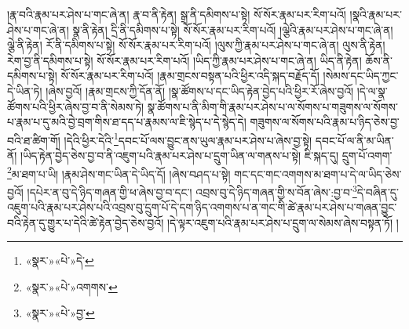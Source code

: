 །རྣ་བའི་རྣམ་པར་ཤེས་པ་གང་ཞེ་ན། རྣ་བ་ནི་རྟེན། སྒྲ་ནི་དམིགས་པ་སྟེ། སོ་སོར་རྣམ་པར་རིག་པའོ། །སྣའི་རྣམ་པར་ཤེས་པ་གང་ཞེ་ན། སྣ་ནི་རྟེན། དྲི་ནི་དམིགས་པ་སྟེ། སོ་སོར་རྣམ་པར་རིག་པའོ། །ལྕེའི་རྣམ་པར་ཤེས་པ་གང་ཞེ་ན། ལྕེ་ནི་རྟེན། རོ་ནི་དམིགས་པ་སྟེ། སོ་སོར་རྣམ་པར་རིག་པའོ། །ལུས་ཀྱི་རྣམ་པར་ཤེས་པ་གང་ཞེ་ན། ལུས་ནི་རྟེན། རེག་བྱ་ནི་དམིགས་པ་སྟེ། སོ་སོར་རྣམ་པར་རིག་པའོ། །ཡིད་ཀྱི་རྣམ་པར་ཤེས་པ་གང་ཞེ་ན། ཡིད་ནི་རྟེན། ཆོས་ནི་དམིགས་པ་སྟེ། སོ་སོར་རྣམ་པར་རིག་པའོ། །རྣམ་གྲངས་བསྟན་པའི་ཕྱིར་འདི་སྐད་བརྗོད་དོ། །སེམས་དང་ཡིད་ཀྱང་དེ་ཡིན་ཏེ། །ཞེས་བྱའོ། །རྣམ་གྲངས་ཀྱི་དོན་ནོ། །སྣ་ཚོགས་པ་དང་ཡིད་རྟེན་བྱེད་པའི་ཕྱིར་རོ་ཞེས་བྱའོ། །དེ་ལ་སྣ་ཚོགས་པའི་ཕྱིར་ཞེས་བྱ་བ་ནི་སེམས་ཏེ། སྣ་ཚོགས་པ་ནི་མིག་གི་རྣམ་པར་ཤེས་པ་ལ་སོགས་པ་གཟུགས་ལ་སོགས་པ་རྣམ་པ་དུ་མའི་བྱེ་བྲག་གིས་ཐ་དད་པ་རྣམས་ལ་ཇི་སྙེད་པ་དེ་སྙེད་དེ། གཟུགས་ལ་སོགས་པའི་རྣམ་པ་ཉིད་ཅེས་བྱ་བའི་ཐ་ཚིག་གོ། །དེའི་ཕྱིར་དེའི་\footnote{«སྣར་»«པེ་»དེ་}དབང་པོ་ལས་བྱུང་ནས་ཡུལ་རྣམ་པར་ཤེས་པ་ཞེས་བྱ་སྟེ། དབང་པོ་ལ་ནི་མ་ཡིན་ནོ། །ཡིད་རྟེན་བྱེད་ཅེས་བྱ་བ་ནི་འཇུག་པའི་རྣམ་པར་ཤེས་པ་དྲུག་ཡིན་ལ་གནས་པ་སྟེ། ཇི་སྐད་དུ། དྲུག་པོ་འགག་\footnote{«སྣར་»«པེ་»འགགས་}མ་ཐག་པ་ཡི། །རྣམ་ཤེས་གང་ཡིན་དེ་ཡིད་དོ། །ཞེས་བཤད་པ་སྟེ། གང་དང་གང་འགགས་མ་ཐག་པ་དེ་ལ་ཡིད་ཅེས་བྱའོ། །དཔེར་ན་བུ་དེ་ཉིད་གཞན་གྱི་ཕ་ཞེས་བྱ་བ་དང་། འབྲས་བུ་དེ་ཉིད་གཞན་གྱི་ས་བོན་ཞེས་:བྱ་བ་\footnote{«སྣར་»«པེ་»བྱ་}དེ་བཞིན་དུ་འཇུག་པའི་རྣམ་པར་ཤེས་པའི་འབྲས་བུ་དྲུག་པོ་དེ་དག་ཉིད་འགགས་པ་ན་གང་གི་ཚེ་རྣམ་པར་ཤེས་པ་གཞན་བྱུང་བའི་རྟེན་དུ་གྱུར་པ་དེའི་ཚེ་རྟེན་བྱེད་ཅེས་བྱའོ། །དེ་ལྟར་འཇུག་པའི་རྣམ་པར་ཤེས་པ་དྲུག་ལ་སེམས་ཞེས་བསྟན་ཏོ། །
